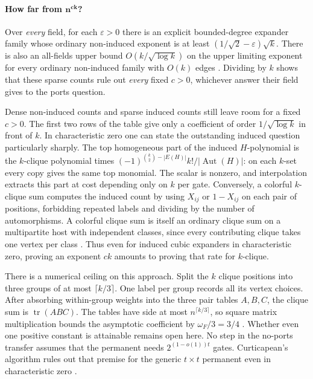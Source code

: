 \documentclass[11pt]{article}
\theoremstyle{definition}
\begin{document}
\paragraph{How far from \(\boldsymbol{n^{ck}}\)?}
Over \emph{every} field, for each \(\varepsilon>0\) there is an explicit
bounded-degree expander family whose ordinary non-induced exponent is
at least \((1/\sqrt{2}-\varepsilon)\sqrt{k}\). There is also an
all-fields upper bound \(O(k/\sqrt{\log k})\) on the upper limiting
exponent for every ordinary non-induced family with \(O(k)\) edges
\cite{sparse-patterns}. Dividing by \(k\) shows that these sparse counts
rule out \emph{every} fixed \(c>0\), whichever answer their field gives
to the ports question.

Dense non-induced counts and sparse induced counts still leave room
for a fixed \(c>0\). The first two rows of the table give only a
coefficient of order \(1/\sqrt{\log k}\) in front of \(k\). In
characteristic zero one can state the outstanding induced question
particularly sharply. The top homogeneous part of the induced
\(H\)-polynomial is the \(k\)-clique polynomial times
\((-1)^{\binom{k}{2}-|E(H)|}k!/|\operatorname{Aut}(H)|\):
on each \(k\)-set every copy gives the same top monomial. The scalar
is nonzero, and interpolation extracts this part at cost depending
only on \(k\) per gate. Conversely, a colorful \(k\)-clique sum
computes the induced count by using \(X_{ij}\) or \(1-X_{ij}\) on
each pair of positions, forbidding repeated labels and dividing by
the number of automorphisms. A colorful clique sum is itself an ordinary
clique sum on a multipartite host with independent classes, since every
contributing clique takes one vertex per class \cite{pairtables,sparse-patterns}.
Thus even for induced
cubic expanders in characteristic zero, proving an exponent \(ck\)
amounts to proving that rate for \(k\)-clique.

There is a numerical ceiling on this approach. Split the \(k\) clique
positions into three groups of at most \(\lceil k/3\rceil\). One label
per group records all its vertex choices. After absorbing within-group
weights into the three pair tables \(A,B,C\), the clique sum is
\(\operatorname{tr}(ABC)\). The tables have side at most
\(n^{\lceil k/3\rceil}\), so square matrix multiplication bounds the
asymptotic coefficient by \(\omega_F/3=3/4\) \cite{matrix-exponent}. Whether even
one positive constant is attainable remains open here. No step in the
no-ports transfer assumes that the permanent needs \(2^{(1-o(1))t}\)
gates. Curticapean's algorithm rules out that premise for the generic
\(t\times t\) permanent even in characteristic zero \cite{stars}.
\end{document}
